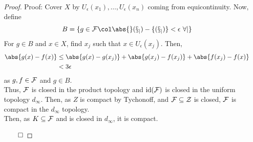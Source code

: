 \begin{proof}{Proof:}
    Cover $X$ by $U_{\epsilon}(x_1), \ldots, U_{\epsilon}(x_n)$ coming from equicontinuity. Now, define
    \[ B = \{g \in \cal{F} \col \abs{g(x_j) - f(x_j)} < \epsilon \ \forall j\} \]
    For $g \in B$ and $x \in X$, find $x_j$ such that $x \in U_{\epsilon}(x_j)$. Then,
    \begin{align*}
        \abs{g(x) - f(x)} &\leq \abs{g(x) - g(x_j)} + \abs{g(x_j) - f(x_j)} + \abs{f(x_j) - f(x)}\\
        &< 3\epsilon
    \end{align*}
    as $g, f \in \cal{F}$ and $g \in B$.\\

    Thus, $\cal{F}$ is closed in the product topology and $\operatorname{id}(\cal{F})$ is closed in the uniform topology $d_{\infty}$. Then, as $Z$ is compact by Tychonoff, and $\cal{F} \subseteq Z$ is closed, $\cal{F}$ is compact in the $d_{\infty}$ topology.\\

    Then, as $K \subseteq \cal{F}$ and is closed in $d_{\infty}$, it is compact.

    $\qed$
\end{proof}
